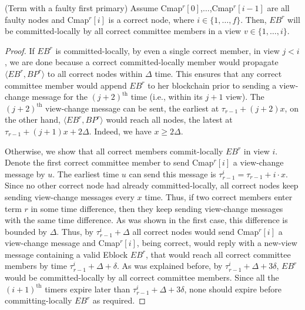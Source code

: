 \begin{lemma}{(Term with a faulty first primary)}
Assume Cmap$^r[0]$,$\dots$,Cmap$^r[i-1]$ are all faulty nodes and Cmap$^r[i]$ is a correct node, where $i \in \{ 1, \dots ,f \}$. Then, $EB^r$ will be committed-locally by all correct committee members in a view $v \in \{ 1, \dots ,i \}$.
\end{lemma}
\begin{proof}
If $EB^r$ is committed-locally, by even a single correct member, in view $j<i$, we are done because a correct committed-locally member would propagate $\langle EB^r, BP^r\rangle$ to all correct nodes within $\Delta$ time. This ensures that any correct committee member would append $EB^r$ to her blockchain prior to sending a view-change message for the $(j+2)^\text{th}$ time (i.e., within its $j+1$ view). The $(j+2)^\text{th}$ view-change message can be sent, the earliest at $\tau_{r-1}+(j+2)x$, on the other hand, $\langle EB^r, BP^r\rangle$ would reach all nodes, the latest at $\tau_{r-1}+(j+1)x+2\Delta$. Indeed, we have $x\geq 2\Delta$.

Otherwise, we show that all correct members commit-locally $EB^r$ in view $i$. Denote the first correct committee member to send Cmap$^r[i]$ a view-change message by $u$. The earliest time $u$ can send this message is $\tau_{r-1}^i=\tau_{r-1}+i \cdot x$. Since no other correct node had already committed-locally, all correct nodes keep sending view-change messages every $x$ time. Thus, if two correct members enter term $r$ in some time difference, then they keep sending view-change messages with the same time difference. As was shown in the first case, this difference is bounded by $\Delta$. Thus, by $\tau_{r-1}^i+\Delta$ all correct nodes would send Cmap$^r[i]$ a view-change message and Cmap$^r[i]$, being correct, would reply with a new-view message containing a valid Eblock $EB^r$, that would reach all correct committee members by time $\tau_{r-1}^i+\Delta+\delta$. As was explained before, by $\tau_{r-1}^i+\Delta+3\delta$, $EB^r$ would be committed-locally by all correct committee members. Since all the $(i+1)^\text{th}$ timers expire later than $\tau_{r-1}^i+\Delta+3\delta$, none should expire before committing-locally $EB^r$ as required.
\end{proof}

